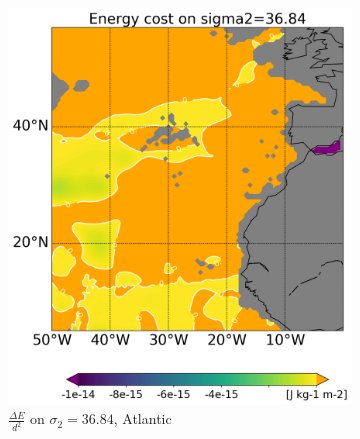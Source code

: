 \begin{figure}[htbp]
\begin{subfigure}[b]{0.4\textwidth}
         \includegraphics[width=\textwidth]{plots/energy/atlantic_energy/Map2dcyl_neg_energy_on_sigma2_3684e-2_reg310Eto360E05Nto57N_1990to1998av_WOCE.png}
         \caption{$\frac{\Delta E}{d^2}$ on $\sigma_2 = 36.84$, Atlantic}
         \label{fig:subplot_atlantic_neg_energy_sigma_2}
     \end{subfigure}
     \hfill
     \begin{subfigure}[b]{0.4\textwidth}
         

\end{subfigure}
\end{figure}
